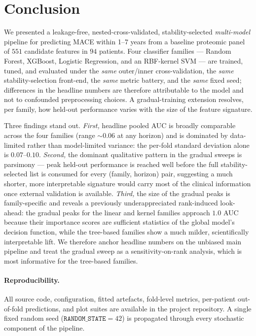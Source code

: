 \documentclass[11pt,a4paper]{article}
\begin{document}
\section{Conclusion}
\label{sec:conclusion}

We presented a leakage-free, nested-cross-validated, stability-selected
\emph{multi-model} pipeline for predicting MACE within 1--7 years from a
baseline proteomic panel of $551$ candidate features in $94$ patients.
Four classifier families --- Random Forest, XGBoost, Logistic Regression,
and an RBF-kernel SVM --- are trained, tuned, and evaluated under the
\emph{same} outer/inner cross-validation, the \emph{same}
stability-selection front-end, the \emph{same} metric battery, and the
\emph{same} fixed seed; differences in the headline numbers are therefore
attributable to the model and not to confounded preprocessing choices. A
gradual-training extension resolves, per family, how held-out
performance varies with the size of the feature signature.

Three findings stand out. \emph{First,} headline pooled AUC is broadly
comparable across the four families (range $\sim 0.06$ at any horizon)
and is dominated by data-limited rather than model-limited variance:
the per-fold standard deviation alone is $0.07$--$0.10$. \emph{Second,}
the dominant qualitative pattern in the gradual sweeps is parsimony ---
peak held-out performance is reached well before the full
stability-selected list is consumed for every (family, horizon) pair,
suggesting a much shorter, more interpretable signature would carry
most of the clinical information once external validation is available.
\emph{Third,} the size of the gradual peaks is family-specific and
reveals a previously underappreciated rank-induced look-ahead: the
gradual peaks for the linear and kernel families approach $1.0$ AUC
because their importance scores are sufficient statistics of the global
model's decision function, while the tree-based families show a much
milder, scientifically interpretable lift. We therefore anchor headline
numbers on the unbiased main pipeline and treat the gradual sweep as a
sensitivity-on-rank analysis, which is most informative for the
tree-based families.

\paragraph{Reproducibility.}
All source code, configuration, fitted artefacts, fold-level metrics,
per-patient out-of-fold predictions, and plot suites are available in
the project repository. A single fixed random seed
($\texttt{RANDOM\_STATE}=42$) is propagated through every stochastic
component of the pipeline.

% 
% 
\end{document}
